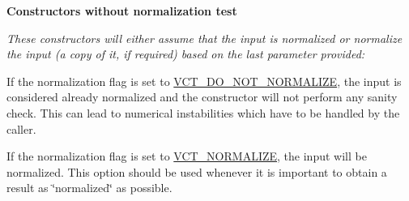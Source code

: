 \begin{Indent}{\bf Constructors without normalization test}\par
{\em These constructors will either assume that the input is normalized or normalize the input (a copy of it, if required) based on the last parameter provided\+: 
\begin{DoxyItemize}
\item If the normalization flag is set to \hyperlink{vct_forward_declarations_8h_a6fd516b0c35fa9967b4da5f03a788985}{V\+C\+T\+\_\+\+D\+O\+\_\+\+N\+O\+T\+\_\+\+N\+O\+R\+M\+A\+L\+I\+Z\+E}, the input is considered already normalized and the constructor will not perform any sanity check. This can lead to numerical instabilities which have to be handled by the caller.


\item If the normalization flag is set to \hyperlink{vct_forward_declarations_8h_ae54c682b919a7c5743ea498810518565}{V\+C\+T\+\_\+\+N\+O\+R\+M\+A\+L\+I\+Z\+E}, the input will be normalized. This option should be used whenever it is important to obtain a result as \char`\"{}normalized\char`\"{} as possible.



\end{DoxyItemize}}
\end{Indent}
